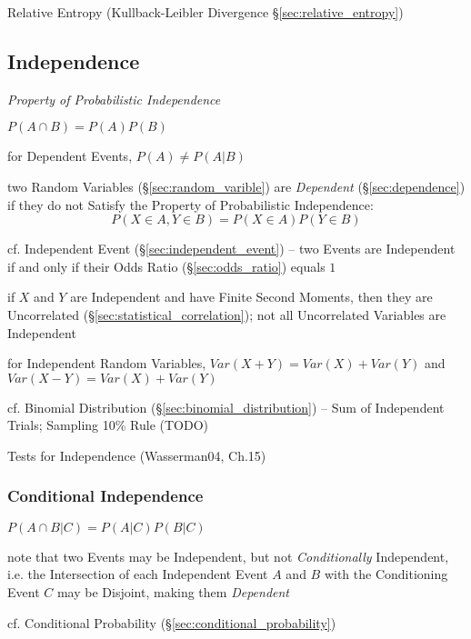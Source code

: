\fist Relative Entropy (Kullback-Leibler Divergence
\S\ref{sec:relative_entropy})



\subsection{Independence}\label{sec:independence}

\emph{Property of Probabilistic Independence}

$P(A \cap B) = P(A)P(B)$

for Dependent Events, $P(A) \neq P(A|B)$

two Random Variables (\S\ref{sec:random_varible}) are \emph{Dependent}
(\S\ref{sec:dependence}) if they do not Satisfy the Property of
Probabilistic Independence:
\[
  P(X \in A, Y \in B) = P(X \in A) P(Y \in B)
\]

\fist cf. Independent Event (\S\ref{sec:independent_event}) --
two Events are Independent if and only if their Odds Ratio
(\S\ref{sec:odds_ratio}) equals $1$

if $X$ and $Y$ are Independent and have Finite Second Moments, then they are
Uncorrelated (\S\ref{sec:statistical_correlation}); not all Uncorrelated
Variables are Independent

for Independent Random Variables, $Var(X + Y) = Var(X) + Var(Y)$ and
$Var(X - Y) = Var(X) + Var(Y)$

cf. Binomial Distribution (\S\ref{sec:binomial_distribution}) -- Sum of
Independent Trials; Sampling 10\% Rule (TODO)

Tests for Independence (Wasserman04, Ch.15) %



\subsubsection{Conditional Independence}\label{sec:conditional_independence}

$P(A \cap B | C) = P(A|C)P(B|C)$

note that two Events may be Independent, but not \emph{Conditionally}
Independent, i.e. the Intersection of each Independent Event $A$ and $B$ with
the Conditioning Event $C$ may be Disjoint, making them \emph{Dependent}

\fist cf. Conditional Probability (\S\ref{sec:conditional_probability})

